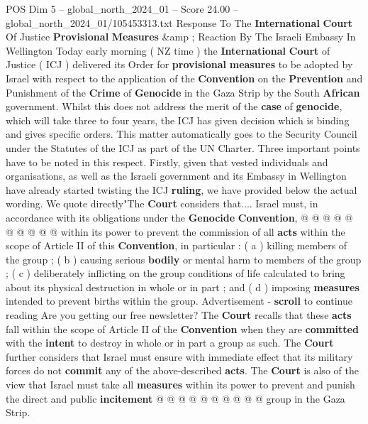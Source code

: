 \begin{textsample}{POS Dim 5 – global\_north\_2024\_01 – Score 24.00 – global\_north\_2024\_01/105453313.txt}  \label{ex:f5_pos_131}
Response To The \textbf{International} \textbf{Court} Of Justice \textbf{Provisional} \textbf{Measures} \&amp ; Reaction By The Israeli Embassy In Wellington Today early morning ( NZ time ) the \textbf{International} \textbf{Court} of Justice ( ICJ ) delivered its Order for \textbf{provisional} \textbf{measures} to be adopted by Israel with respect to the application of the \textbf{Convention} on the \textbf{Prevention} and Punishment of the \textbf{Crime} of \textbf{Genocide} in the Gaza Strip by the South \textbf{African} government.
Whilst this does not address the merit of the \textbf{case} of \textbf{genocide}, which will take three to four years, the ICJ has given decision which is binding and gives specific orders.
This matter automatically goes to the Security Council under the Statutes of the ICJ as part of the UN Charter.
Three important points have to be noted in this respect.
Firstly, given that vested individuals and organisations, as well as the Israeli government and its Embassy in Wellington have already started twisting the ICJ \textbf{ruling}, we have provided below the actual wording.
We quote directly"The \textbf{Court} considers that....
Israel must, in accordance with its obligations under the \textbf{Genocide} \textbf{Convention}, @ @ @ @ @ @ @ @ @ @ within its power to prevent the commission of all \textbf{acts} within the scope of Article II of this \textbf{Convention}, in particular : ( a ) killing members of the group ; ( b ) causing serious \textbf{bodily} or mental harm to members of the group ; ( c ) deliberately inflicting on the group conditions of life calculated to bring about its physical destruction in whole or in part ; and ( d ) imposing \textbf{measures} intended to prevent births within the group.
Advertisement - \textbf{scroll} to continue reading Are you getting our free newsletter?
The \textbf{Court} recalls that these \textbf{acts} fall within the scope of Article II of the \textbf{Convention} when they are \textbf{committed} with the \textbf{intent} to destroy in whole or in part a group as such.
The \textbf{Court} further considers that Israel must ensure with immediate effect that its military forces do not \textbf{commit} any of the above-described \textbf{acts}.
The \textbf{Court} is also of the view that Israel must take all \textbf{measures} within its power to prevent and punish the direct and public \textbf{incitement} @ @ @ @ @ @ @ @ @ @ group in the Gaza Strip.

\end{textsample}
